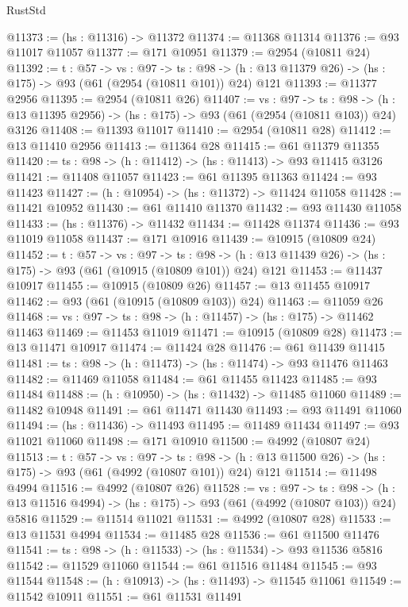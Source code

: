 \begin{lexlean}{RustStd}
\begin{coremodule}
@11373 := (hs : @11316) -> @11372
@11374 := @11368 @11314
@11376 := @93 @11017 @11057
@11377 := @171 @10951
@11379 := @2954 (@10811 @24)
@11392 := {t : @57} ->
  {vs : @97} ->
  {ts : @98} -> (h : @13 @11379 @26) -> (hs : @175) -> @93 (@61 (@2954 (@10811 @101)) @24) @121
@11393 := @11377 @2956
@11395 := @2954 (@10811 @26)
@11407 := {vs : @97} ->
  {ts : @98} -> (h : @13 @11395 @2956) -> (hs : @175) -> @93 (@61 (@2954 (@10811 @103)) @24) @3126
@11408 := @11393 @11017
@11410 := @2954 (@10811 @28)
@11412 := @13 @11410 @2956
@11413 := @11364 @28
@11415 := @61 @11379 @11355
@11420 := {ts : @98} -> (h : @11412) -> (hs : @11413) -> @93 @11415 @3126
@11421 := @11408 @11057
@11423 := @61 @11395 @11363
@11424 := @93 @11423
@11427 := (h : @10954) -> (hs : @11372) -> @11424 @11058
@11428 := @11421 @10952
@11430 := @61 @11410 @11370
@11432 := @93 @11430 @11058
@11433 := (hs : @11376) -> @11432
@11434 := @11428 @11374
@11436 := @93 @11019 @11058
@11437 := @171 @10916
@11439 := @10915 (@10809 @24)
@11452 := {t : @57} ->
  {vs : @97} ->
  {ts : @98} -> (h : @13 @11439 @26) -> (hs : @175) -> @93 (@61 (@10915 (@10809 @101)) @24) @121
@11453 := @11437 @10917
@11455 := @10915 (@10809 @26)
@11457 := @13 @11455 @10917
@11462 := @93 (@61 (@10915 (@10809 @103)) @24)
@11463 := @11059 @26
@11468 := {vs : @97} -> {ts : @98} -> (h : @11457) -> (hs : @175) -> @11462 @11463
@11469 := @11453 @11019
@11471 := @10915 (@10809 @28)
@11473 := @13 @11471 @10917
@11474 := @11424 @28
@11476 := @61 @11439 @11415
@11481 := {ts : @98} -> (h : @11473) -> (hs : @11474) -> @93 @11476 @11463
@11482 := @11469 @11058
@11484 := @61 @11455 @11423
@11485 := @93 @11484
@11488 := (h : @10950) -> (hs : @11432) -> @11485 @11060
@11489 := @11482 @10948
@11491 := @61 @11471 @11430
@11493 := @93 @11491 @11060
@11494 := (hs : @11436) -> @11493
@11495 := @11489 @11434
@11497 := @93 @11021 @11060
@11498 := @171 @10910
@11500 := @4992 (@10807 @24)
@11513 := {t : @57} ->
  {vs : @97} ->
  {ts : @98} -> (h : @13 @11500 @26) -> (hs : @175) -> @93 (@61 (@4992 (@10807 @101)) @24) @121
@11514 := @11498 @4994
@11516 := @4992 (@10807 @26)
@11528 := {vs : @97} ->
  {ts : @98} -> (h : @13 @11516 @4994) -> (hs : @175) -> @93 (@61 (@4992 (@10807 @103)) @24) @5816
@11529 := @11514 @11021
@11531 := @4992 (@10807 @28)
@11533 := @13 @11531 @4994
@11534 := @11485 @28
@11536 := @61 @11500 @11476
@11541 := {ts : @98} -> (h : @11533) -> (hs : @11534) -> @93 @11536 @5816
@11542 := @11529 @11060
@11544 := @61 @11516 @11484
@11545 := @93 @11544
@11548 := (h : @10913) -> (hs : @11493) -> @11545 @11061
@11549 := @11542 @10911
@11551 := @61 @11531 @11491

\end{coremodule}
\end{lexlean}
